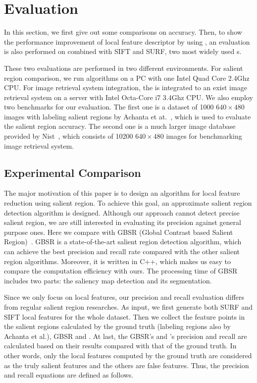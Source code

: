 \section{Evaluation}
\label{sec:evaluation}

In this section, we first give out some comparisons on accuracy. Then, to show the performance improvement of local feature descriptor by using {\sys}, an evaluation is also performed on {\sys} combined with SIFT and SURF, two most widely used {\lfea}s.

These two evaluations are performed in two different environments. For salient region comparison, we run algorithms on a PC with one Intel Quad Core 2.4Ghz CPU. For image retrieval system integration, the {\sys} is integrated to an exist image retrieval system on a server with Intel Octa-Core i7 3.4Ghz CPU. We also employ two benchmarks for our evaluation. The first one is a dataset of 1000 $640\times480$images with labeling salient regions by Achanta et at.~\cite{achanta2009frequency}, which is used to evaluate the salient region accuracy. The second one is a much larger image database provided by Nist~\cite{nister-stewenius-cvpr-2006}, which consists of 10200 $640\times480$ images for benchmarking image retrieval system.

\subsection{Experimental Comparison}
\label{sec:evaluation_comparison}

The major motivation of this paper is to design an algorithm for local feature reduction using salient region. To achieve this goal, an approximate salient region detection algorithm is designed. Although our approach cannot detect precise salient region, we are still interested in evaluating its precision against general purpose ones. Here we compare {\sys} with GBSR (Global Contrast based Salient Region)~\cite{cheng2011global}. GBSR is a state-of-the-art salient region detection algorithm, which can achieve the best precision and recall rate compared with the other salient region algorithms. Moreover, it is written in C++, which makes us easy to compare the computation efficiency with ours. The processing time of GBSR includes two parts: the saliency map detection and its segmentation.

Since we only focus on local features, our precision and recall evaluation differs from regular salient region researches. As input, we first generate both SURF and SIFT local features for the whole dataset. Then we collect the feature points in the salient regions calculated by the ground truth (labeling regions also by Achanta et al.), GBSR and {\sys}. At last, the GBSR's and {\sys}'s precision and recall are calculated based on their results compared with that of the ground truth. In other words, only the local features computed by the ground truth are considered as the truly salient features and the others are false features. Thus, the precision and recall equations are defined as follows.


